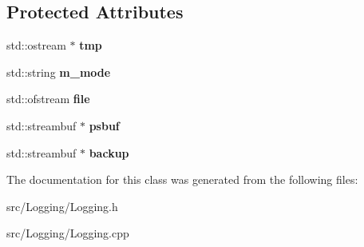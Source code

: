 \subsection*{Protected Attributes}
\begin{DoxyCompactItemize}
\item 
\hypertarget{classLogging_1_1MyStreamBuf_acb3f11f758f216fa88c44ef8823cdd31}{std\-::ostream $\ast$ {\bfseries tmp}}\label{classLogging_1_1MyStreamBuf_acb3f11f758f216fa88c44ef8823cdd31}

\item 
\hypertarget{classLogging_1_1MyStreamBuf_a4e11f05cc94cffb398bf51395f251b90}{std\-::string {\bfseries m\-\_\-mode}}\label{classLogging_1_1MyStreamBuf_a4e11f05cc94cffb398bf51395f251b90}

\item 
\hypertarget{classLogging_1_1MyStreamBuf_a47035c3dec1a0082191b06275195ce57}{std\-::ofstream {\bfseries file}}\label{classLogging_1_1MyStreamBuf_a47035c3dec1a0082191b06275195ce57}

\item 
\hypertarget{classLogging_1_1MyStreamBuf_a27f4638e855cc5ea4214f3d99879b912}{std\-::streambuf $\ast$ {\bfseries psbuf}}\label{classLogging_1_1MyStreamBuf_a27f4638e855cc5ea4214f3d99879b912}

\item 
\hypertarget{classLogging_1_1MyStreamBuf_abecdf6ccab9c410c4396035a8ad48112}{std\-::streambuf $\ast$ {\bfseries backup}}\label{classLogging_1_1MyStreamBuf_abecdf6ccab9c410c4396035a8ad48112}

\end{DoxyCompactItemize}


The documentation for this class was generated from the following files\-:\begin{DoxyCompactItemize}
\item 
src/\-Logging/Logging.\-h\item 
src/\-Logging/Logging.\-cpp\end{DoxyCompactItemize}
